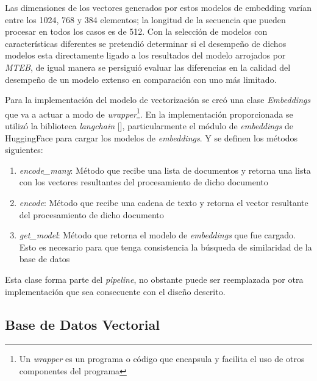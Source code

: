         Las dimensiones de los vectores generados por estos modelos de embedding varían entre los 1024, 768 y 384 elementos; la longitud de la secuencia que pueden procesar en todos los casos es de 512. Con la selección de modelos con características diferentes se pretendió determinar si el desempeño de dichos modelos esta directamente ligado a los resultados del modelo arrojados por \emph{MTEB}, de igual manera se persiguió evaluar las diferencias en la calidad del desempeño de un modelo extenso en comparación con uno más limitado.

    Para la implementación del modelo de vectorización se creó una clase \emph{Embeddings} que va a actuar a modo de \emph{wrapper}\footnote{Un \emph{wrapper} es un programa o código que encapsula y facilita el uso de otros componentes del programa}. En la implementación proporcionada se utilizó la biblioteca \emph{langchain} [\cite{langchain}], particularmente el módulo de \emph{embeddings} de HuggingFace para cargar los modelos de \emph{embeddings}. Y se definen los métodos siguientes:
    \begin{enumerate}
        \item \emph{encode\_many}: Método que recibe una lista de documentos y retorna una lista con los vectores resultantes del procesamiento de dicho documento
        \item \emph{encode}: Método que recibe una cadena de texto y retorna el vector resultante del procesamiento  de dicho documento 
        \item \emph{get\_model}: Método que retorna el modelo de \emph{embeddings} que fue cargado. Esto es necesario para que tenga consistencia la búsqueda de similaridad de la base de datos
    \end{enumerate}

    Esta clase forma parte del \emph{pipeline}, no obstante puede ser reemplazada por otra implementación que sea consecuente con el diseño descrito.

    \subsection{Base de Datos Vectorial}

